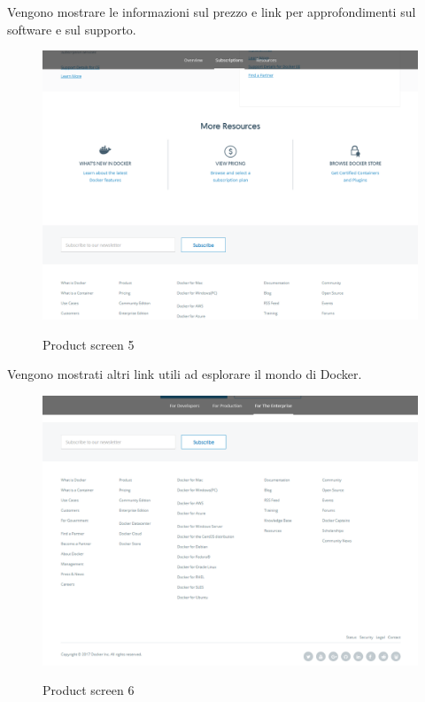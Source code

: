 \documentclass[a4paper]{article}
\begin{document}
\noindent Vengono mostrare le informazioni sul prezzo e link per approfondimenti sul software e sul supporto.

\begin{figure}[H]
	\centering
	\includegraphics[width=\linewidth]{images/product5.png}
    \label{fig:product5}
    \caption{Product screen 5}
\end{figure}

\noindent Vengono mostrati altri link utili ad esplorare il mondo di Docker.

\begin{figure}[H]
	\centering
	\includegraphics[width=\linewidth]{images/product6.png}
    \label{fig:product6}
    \caption{Product screen 6}
\end{figure}
\end{document}
